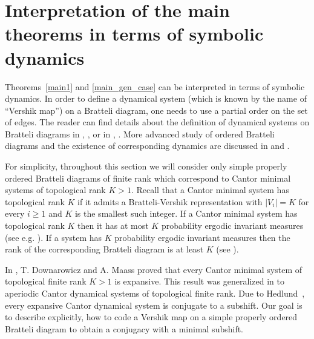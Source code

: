 \documentclass[11pt, english, reqno]{amsart}
\theoremstyle{definition}
\theoremstyle{remark}
\theoremstyle{plain}
\numberwithin{equation}{section}
\begin{document}
{\section{Interpretation of the main theorems in terms of symbolic dynamics}\label{Section7}

Theorems~\ref{main1} and \ref{main_gen_case} can be interpreted in terms
of symbolic dynamics. In order to define a dynamical system
(which is known by the name of ``Vershik map'') on a
  Bratteli diagram, one needs to use a partial order on the set of edges.
The reader can find  details about the definition of dynamical systems
 on Bratteli diagrams  in \cite{HermanPutnamSkau1992},
\cite{GiordanoPutnamSkau1995}, or in \cite{Durand2010},
 \cite{BezuglyiKarpel2016}. More advanced study of ordered  Bratteli
 diagrams and the existence of corresponding dynamics are discussed in
 \cite{BezuglyiKwiatkowskiYassawi2014} and \cite{BezuglyiYassawi2017}.

For simplicity, throughout this section we will consider only simple properly
ordered Bratteli diagrams of finite rank which correspond to Cantor minimal
systems of topological rank $K > 1$. Recall that a Cantor minimal system has topological rank $K$ if it admits a Bratteli-Vershik representation with $|V_i| = K$ for every $i \geq 1$ and $K$ is the smallest such integer. If a Cantor minimal system has topological rank $K$ then it has at most $K$ probability ergodic invariant measures (see e.g. \cite{Durand2010}). If a system has $K$ probability ergodic invariant measures then the rank of the corresponding Bratteli diagram is at least $K$ (see \cite{BezuglyiKwiatkowskiMedynetsSolomyak2013}).

In \cite{DownarowiczMaass2008}, T. Downarowicz and A. Maass
proved that every Cantor minimal system of topological finite rank $K > 1$ is
expansive. This result was generalized in
\cite{BezuglyiKwiatkowskiMedynets2009} to aperiodic Cantor dynamical
systems of topological finite rank. Due to Hedlund~\cite{Hedlund1969},
every expansive Cantor dynamical system is conjugate to a subshift. Our
goal is to describe explicitly, how to code a Vershik map on a simple properly
ordered Bratteli diagram to obtain a conjugacy with a minimal subshift.

}
\end{document}
